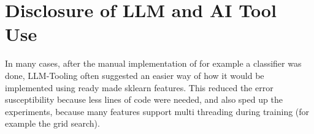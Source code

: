 \section{Disclosure of LLM and AI Tool Use}

In many cases, after the manual implementation of for example a classifier was done, LLM-Tooling often suggested an easier way of how it would be implemented using ready made sklearn features. This reduced the error susceptibility because less lines of code were needed, and also sped up the experiments, because many features support multi threading during training (for example the grid search).